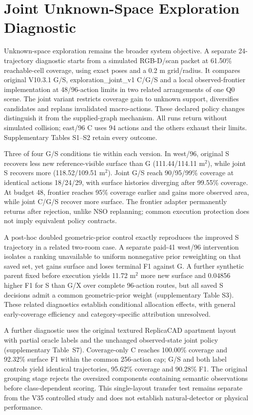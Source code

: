 \clearpage
\section{Joint Unknown-Space Exploration Diagnostic}\label{joint-exploration}

Unknown-space exploration remains the broader system objective. A separate 24-trajectory diagnostic starts from a simulated RGB-D/scan packet at 61.50\% reachable-cell coverage, using exact poses and a 0.2 m grid/radius. It compares original V10.3.1 G/S, exploration\_joint\_v1 C/G/S and a local observed-frontier implementation at 48/96-action limits in two related arrangements of one Q0 scene. The joint variant restricts coverage gain to unknown support, diversifies candidates and replans invalidated macro-actions. These declared policy changes distinguish it from the supplied-graph mechanism. All runs return without simulated collision; east/96 C uses 94 actions and the others exhaust their limits. Supplementary Tables S1--S2 retain every outcome.

Three of four G/S conditions tie within each version. In west/96, original S recovers less new reference-visible surface than G (111.44/114.11 m$^2$), while joint S recovers more (118.52/109.51 m$^2$). Joint G/S reach 90/95/99\% coverage at identical actions 18/24/29, with surface histories diverging after 99.55\% coverage. At budget 48, frontier reaches 95\% coverage earlier and gains more observed area, while joint C/G/S recover more surface. The frontier adapter permanently returns after rejection, unlike NSO replanning; common execution protection does not imply equivalent policy contracts.

A post-hoc doubled geometric-prior control exactly reproduces the improved S trajectory in a related two-room case. A separate paid-41 west/96 intervention isolates a ranking unavailable to uniform nonnegative prior reweighting on that saved set, yet gains surface and loses terminal F1 against G. A further synthetic parent fixed before execution yields 11.72 m$^2$ more new surface and 0.04856 higher F1 for S than G/X over complete 96-action routes, but all saved S decisions admit a common geometric-prior weight (supplementary Table S3). These related diagnostics establish conditional allocation effects, with general early-coverage efficiency and category-specific attribution unresolved.




A further diagnostic uses the original textured ReplicaCAD apartment layout with partial oracle labels and the unchanged observed-state joint policy (supplementary Table~S7). Coverage-only C reaches 100.00\% coverage and 92.32\% surface F1 within the common 256-action cap; G/S and both label controls yield identical trajectories, 95.62\% coverage and 90.28\% F1. The original grouping stage rejects the oversized components containing semantic observations before class-dependent scoring. This single-layout transfer test remains separate from the V35 controlled study and does not establish natural-detector or physical performance.

